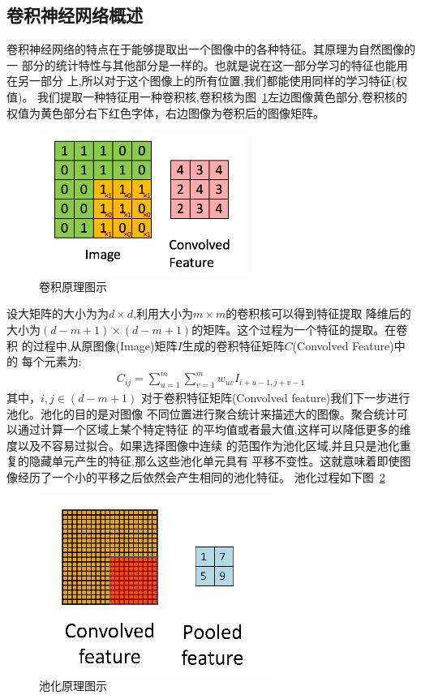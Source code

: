 \subsection{卷积神经网络概述}
卷积神经网络的特点在于能够提取出一个图像中的各种特征。其原理为自然图像的一
部分的统计特性与其他部分是一样的。也就是说在这一部分学习的特征也能用在另一部分
上,所以对于这个图像上的所有位置,我们都能使用同样的学习特征(权值)。
我们提取一种特征用一种卷积核,卷积核为图~\ref{fig:cnn1}左边图像黄色部分,卷积核的权值为黄色部分右下红色字体，右边图像为卷积后的图像矩阵。
\begin{figure}[htb]
\centering
\includegraphics[scale=0.7]{../figures/conv.png} 
\caption{卷积原理图示}
\label{fig:cnn1}
\end{figure}
设大矩阵的大小为为$d\times d$,利用大小为$m\times m$的卷积核可以得到特征提取
降维后的大小为$(d-m+1)\times(d-m+1)$的矩阵。这个过程为一个特征的提取。在卷积
的过程中,从原图像(Image)矩阵$I$生成的卷积特征矩阵$C$(Convolved Feature)中的
每个元素为:
\begin{eqnarray}
C_{ij}=\sum_{u=1}^m\sum_{v=1}^mw_{uv}I_{i+u-1,j+v-1}
\end{eqnarray}
其中，$i,j\in(d-m+1)$
对于卷积特征矩阵(Convolved feature)我们下一步进行池化。池化的目的是对图像
不同位置进行聚合统计来描述大的图像。聚合统计可以通过计算一个区域上某个特定特征
的平均值或者最大值,这样可以降低更多的维度以及不容易过拟合。如果选择图像中连续
的范围作为池化区域,并且只是池化重复的隐藏单元产生的特征,那么这些池化单元具有
平移不变性。这就意味着即使图像经历了一个小的平移之后依然会产生相同的池化特征。
池化过程如下图~\ref{fig:cnn2}
\begin{figure}[htb]
\centering
\includegraphics[scale=0.7]{../figures/pool.png} 
\caption{池化原理图示}
\label{fig:cnn2}
\end{figure}
